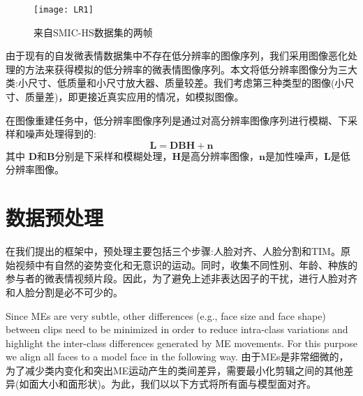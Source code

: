 \begin{figure}[!htbp]
\centering
\texttt{[image: LR1]}
\caption{来自SMIC-HS数据集的两帧}
\label{fig11}
\end{figure}

由于现有的自发微表情数据集中不存在低分辨率的图像序列，我们采用图像恶化处理的方法来获得模拟的低分辨率的微表情图像序列。本文将低分辨率图像分为三大类:小尺寸、低质量和小尺寸放大器、质量较差\citep{wang2014low}。我们考虑第三种类型的图像(小尺寸、质量差)，即更接近真实应用的情况，如模拟图像。

在图像重建任务中，低分辨率图像序列是通过对高分辨率图像序列进行模糊、下采样和噪声处理得到的\citep{shi2018hallucinating}:
\begin{equation}
    \label{eq1}
    \boldsymbol{L} = \boldsymbol{DBH}+\boldsymbol{n}
\end{equation}
其中 $\boldsymbol{D}$和$\boldsymbol{B}$分别是下采样和模糊处理，$\boldsymbol{H}$是高分辨率图像，$\boldsymbol{n}$是加性噪声，$\boldsymbol{L}$是低分辨率图像。

\section{数据预处理}

在我们提出的框架中，预处理主要包括三个步骤:人脸对齐、人脸分割和TIM。原始视频中有自然的姿势变化和无意识的运动。同时，收集不同性别、年龄、种族的参与者的微表情视频片段。因此，为了避免上述非表达因子的干扰，进行人脸对齐和人脸分割是必不可少的。

Since MEs are very subtle, other differences (e.g., face size and face shape) between clips need to be minimized in order to reduce intra-class variations and highlight the inter-class differences generated by ME movements. For this purpose we align all faces to a model face in the following way.
由于MEs是非常细微的，为了减少类内变化和突出ME运动产生的类间差异，需要最小化剪辑之间的其他差异(如面大小和面形状)。为此，我们以以下方式将所有面与模型面对齐。

